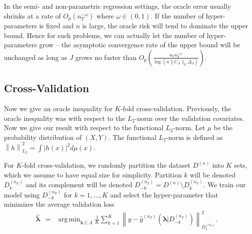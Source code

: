 \documentclass[12pt]{article} %
\theoremstyle{definition}
\DeclareMathOperator*{\argmin}{arg\,min}
\begin{document}
In the semi- and non-parametric regression settings, the oracle error usually shrinks at a rate of $O_p(n_T^{-\omega})$ where $\omega \in (0, 1)$.
If the number of hyper-parameters is fixed and $n$ is large, the oracle risk will tend to dominate the upper bound.
Hence for such problems, we can actually let the number of hyper-parameters grow -- the asymptotic convergence rate of the upper bound will be unchanged as long as $J$ grows no faster than
$
O_p\left (
\frac{n_{V} n_T^{-\omega}}{\log (n \|C_\Lambda\|_V \Delta_{\Lambda})}
\right ).
$

\subsection{Cross-Validation}\label{sec:cv}

Now we give an oracle inequality for $K$-fold cross-validation.
Previously, the oracle inequality was with respect to the $L_2$-norm over the validation covariates.
Now we give our result with respect to the functional $L_2$-norm.
Let $\mu$ be the probability distribution of $(X,Y)$.
The functional $L_2$-norm is defined as
$
\left \| h \right \|^2_{L_2} = \int \left |h(x) \right |^2 d\mu(x)
$.

For $K$-fold cross-validation, we randomly partition the dataset $D^{(n)}$ into $K$ sets, which we assume to have equal size for simplicity. Partition $k$ will be denoted $D_k^{(n_V)}$ and its complement will be denoted $D_{-k}^{(n_T)} = D^{(n)} \setminus D_k^{(n_V)}$. We train our model using $D_{-k}^{(n_T)}$ for $k=1,...,K$ and select the hyper-parameter that minimizes the average validation loss
\begin{eqnarray}
\label{kfold_opt}
\hat{\boldsymbol \lambda} &=& \argmin_{\boldsymbol{\lambda} \in\Lambda} \frac{1}{K} \sum_{k=1}^K  \left \| y-\hat{g}^{(n_T)}(\boldsymbol \lambda | D_{-k}^{(n_T)}) \right \|_{D_k^{(n_V)}}^{2}.
\end{eqnarray}
\end{document}
